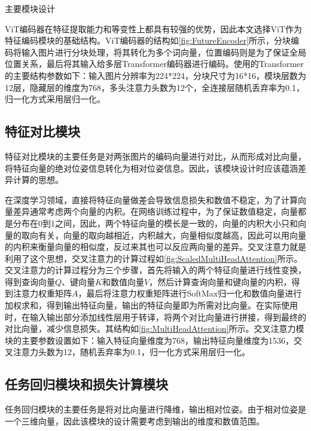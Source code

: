\documentclass{Diploma}
\begin{document}
\begin{subfigures}[submodules]{主要模块设计}
\end{subfigures}

ViT编码器在特征提取能力和等变性上都具有较强的优势，因此本文选择ViT作为特征编码模块的基础结构。ViT编码器的结构如\ref{fig:FutureEncoder}所示，分块编码将输入图片进行分块处理，将其转化为多个词向量，位置编码则是为了保证全局位置关系，最后将其输入给多层Transformer编码器进行编码。使用的Transformer的主要结构参数如下：输入图片分辨率为224*224，分块尺寸为16*16，模块层数为12层，隐藏层的维度为768，多头注意力头数为12个，全连接层随机丢弃率为0.1，归一化方式采用层归一化。
\subsection{特征对比模块}
特征对比模块的主要任务是对两张图片的编码向量进行对比，从而形成对比向量，将特征向量的绝对位姿信息转化为相对位姿信息。因此，该模块设计时应该蕴涵差异计算的思想。

在深度学习领域，直接将特征向量做差会导致信息损失和数值不稳定，为了计算向量差异通常考虑两个向量的内积。在网络训练过程中，为了保证数值稳定，向量都是分布在0到1之间，因此，两个特征向量的模长是一致的，向量的内积大小只和向量的取向有关，向量的取向越相近，内积越大，向量相似度越高，因此可以用向量的内积来衡量向量的相似度，反过来其也可以反应两向量的差异。交叉注意力就是利用了这个思想，交叉注意力的计算过程如\ref{fig:ScaledMultiHeadAttention}所示。交叉注意力的计算过程分为三个步骤，首先将输入的两个特征向量进行线性变换，得到查询向量$Q$、键向量$K$和数值向量$V$，然后计算查询向量和键向量的内积，得到注意力权重矩阵$A$，最后将注意力权重矩阵进行SoftMax归一化和数值向量进行加权求和，得到输出特征向量，输出的特征向量即为所需对比向量。在实际使用时，在输入输出部分添加线性层用于转译，将两个对比向量进行拼接，得到最终的对比向量，减少信息损失。其结构如\ref{fig:MultiHeadAttention}所示。交叉注意力模块的主要参数设置如下：输入特征向量维度为768，输出特征向量维度为1536，交叉注意力头数为12，随机丢弃率为0.1，归一化方式采用层归一化。

\subsection{任务回归模块和损失计算模块}
任务回归模块的主要任务是将对比向量进行降维，输出相对位姿。由于相对位姿是一个三维向量，因此该模块的设计需要考虑到输出的维度和数值范围。
\end{document}
